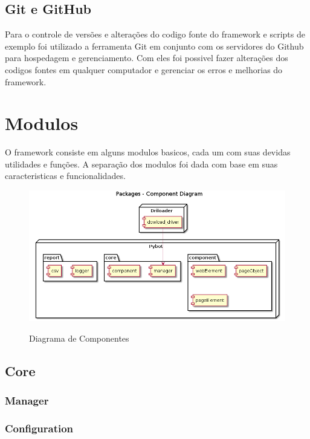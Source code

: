     \subsection{Git e GitHub}
        Para o controle de versões e alterações do codigo fonte do framework e scripts de exemplo foi utilizado a ferramenta
        Git \cite{git} em conjunto com os servidores do Github \cite{github} para hospedagem e gerenciamento. Com eles foi possivel
        fazer alterações dos codigos fontes em qualquer computador e gerenciar os erros e melhorias do framework.


\section{Modulos}

    O framework consiste em alguns modulos basicos, cada um com suas devidas utilidades e funções.
    A separação dos modulos foi dada com base em suas caracteristicas e funcionalidades.

    \begin{figure}[H]
        \vspace*{0,3cm}
        \centering
        \caption{Diagrama de Componentes}
        \includegraphics[width=1\textwidth]{./04-figuras/model}
        \label{fig:modules}
    \end{figure}

    \subsection{Core}
        \subsubsection{Manager}
        \subsubsection{Configuration}

